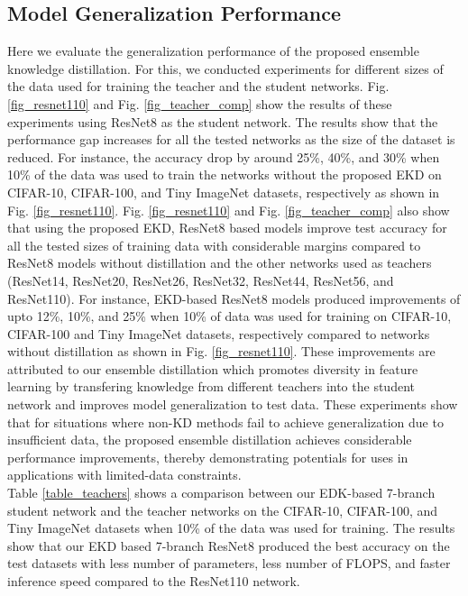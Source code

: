 \documentclass{ecai}
\begin{document}
\subsection{Model Generalization Performance}
Here we evaluate the generalization performance of the proposed ensemble knowledge distillation. For this, we conducted experiments for different sizes of the data used for training the teacher and the student networks. Fig. \ref{fig_resnet110} and Fig. \ref{fig_teacher_comp} show the results of these experiments using ResNet8 as the student network. The results show that the performance gap increases for all the tested networks as the size of the dataset is reduced. For instance, the accuracy drop by around 25\%, 40\%, and 30\% when 10\% of the data was used to train the networks without the proposed EKD on CIFAR-10, CIFAR-100, and Tiny ImageNet datasets, respectively as shown in Fig. \ref{fig_resnet110}.
Fig. \ref{fig_resnet110} and Fig. \ref{fig_teacher_comp} also show that using the proposed EKD, ResNet8 based models improve test accuracy for all the tested sizes of training data with considerable margins compared to ResNet8 models without distillation and the other networks used as teachers (ResNet14, ResNet20, ResNet26, ResNet32, ResNet44, ResNet56, and ResNet110). 
For instance, EKD-based ResNet8 models produced improvements of upto 12\%, 10\%, and 25\% when 10\% of data was used for training on CIFAR-10, CIFAR-100 and Tiny ImageNet datasets, respectively compared to networks without distillation as shown in Fig. \ref{fig_resnet110}. 
These improvements are attributed to our ensemble distillation which promotes diversity in feature learning by transfering knowledge from different teachers into the student network and improves model generalization to test data.
These experiments show that for situations where non-KD methods fail to achieve generalization due to insufficient data, the proposed ensemble distillation achieves considerable performance improvements, thereby demonstrating potentials for uses in applications with limited-data constraints.
\\
\indent
Table \ref{table_teachers} shows a comparison between our EDK-based 7-branch student network and the teacher networks on the CIFAR-10, CIFAR-100, and Tiny ImageNet datasets when 10\% of the data was used for training. The results show that our EKD based 7-branch ResNet8 produced the best accuracy on the test datasets with  less number of parameters,  less number of FLOPS, and faster inference speed compared to the ResNet110 network.
\end{document}
